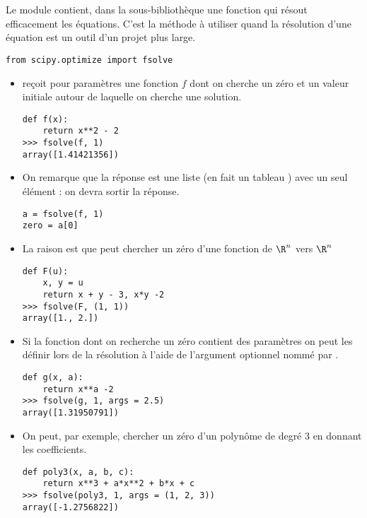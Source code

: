 \section{}\label{sec:fsolve}
Le module  contient, dans la sous-bibliothèque  une fonction  qui résout efficacement les équations. C'est la méthode à utiliser quand la résolution d'une équation est un outil d'un projet plus large.
\begin{lstlisting}
from scipy.optimize import fsolve
\end{lstlisting}
\begin{itemize}
\item {} reçoit pour paramètres une fonction $f$ dont on cherche un zéro et un valeur initiale autour de laquelle on cherche une solution.
\begin{lstlisting}
def f(x):
    return x**2 - 2
>>> fsolve(f, 1)
array([1.41421356])
\end{lstlisting}
\item On remarque que la réponse est une liste (en fait un tableau ) avec un seul élément : on devra sortir la réponse.
\begin{lstlisting}
a = fsolve(f, 1)
zero = a[0]
\end{lstlisting}
\item La raison est que  peut chercher un zéro d'une fonction de $\R^n$ vers $\R^n$
\begin{lstlisting}
def F(u):
    x, y = u
    return x + y - 3, x*y -2
>>> fsolve(F, (1, 1))
array([1., 2.])
\end{lstlisting}
\item Si la fonction dont on recherche un zéro contient des paramètres on peut les définir lors de la résolution à l'aide de l'argument optionnel nommé par .
\begin{lstlisting}
def g(x, a):
    return x**a -2 
>>> fsolve(g, 1, args = 2.5)
array([1.31950791])
\end{lstlisting}

\item On peut, par exemple, chercher un zéro d'un polynôme de degré 3 en donnant les coefficients.
\begin{lstlisting}
def poly3(x, a, b, c):
    return x**3 + a*x**2 + b*x + c 
>>> fsolve(poly3, 1, args = (1, 2, 3))
array([-1.2756822])
\end{lstlisting}
\end{itemize}
    


